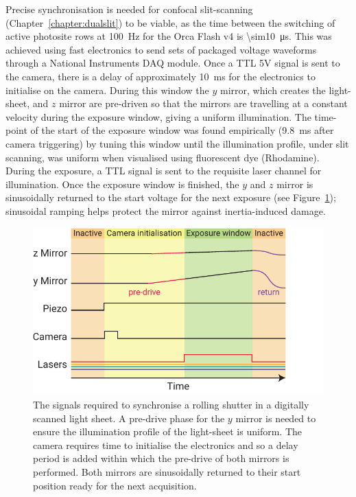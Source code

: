 Precise synchronisation is needed for confocal slit-scanning (Chapter~\ref{chapter:dualslit}) to be viable, as the time between the switching of active \gls{photosite} rows at \SI{100}{\hertz} for the Orca Flash v4 is \SI{\sim10}{\micro\second}. %
This was achieved using fast electronics to send sets of packaged voltage waveforms through a National Instruments \gls{DAQ} module.
Once a \gls{TTL} 5V signal is sent to the camera, there is a delay of approximately \SI{10}{\milli\second} for the electronics to initialise on the camera.
During this window the \(y\) mirror, which creates the \gls{light-sheet}, and \(z\) mirror are pre-driven so that the mirrors are travelling at a constant velocity during the exposure window, giving a uniform illumination.
The time-point of the start of the exposure window was found empirically (\SI{9.8}{\milli\second} after camera triggering) by tuning this window until the illumination profile, under slit scanning, was uniform when visualised using fluorescent dye (Rhodamine).
During the exposure, a \gls{TTL} signal is sent to the requisite laser channel for illumination.
Once the exposure window is finished, the \(y\) and \(z\) mirror is sinusoidally returned to the start voltage for the next exposure (see Figure~\ref{fig:slit_signals}); sinusoidal ramping helps protect the mirror against inertia-induced damage.

\begin{figure}
  \centering
  \includegraphics{slit_signals}
  \caption{The signals required to synchronise a rolling shutter in a digitally scanned light sheet.
  A pre-drive phase for the \(y\) mirror is needed to ensure the illumination profile of the light-sheet is uniform.
  The camera requires time to initialise the electronics and so a delay period is added within which the pre-drive of both mirrors is performed.
  Both mirrors are sinusoidally returned to their start position ready for the next acquisition.
  }\label{fig:slit_signals}
\end{figure}

